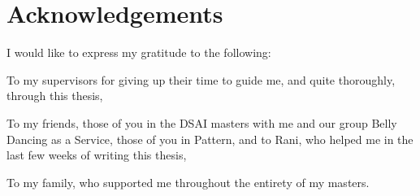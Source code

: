 \chapter*{Acknowledgements}\label{chapter:acknowledgements}

I would like to express my gratitude to the following:

To my supervisors for giving up their time to guide me, and quite thoroughly, through this thesis,

To my friends, those of you in the DSAI masters with me and our group Belly Dancing as a Service, those of you in Pattern, and to Rani, who helped me in the last few weeks of writing this thesis,

To my family, who supported me throughout the entirety of my masters.
